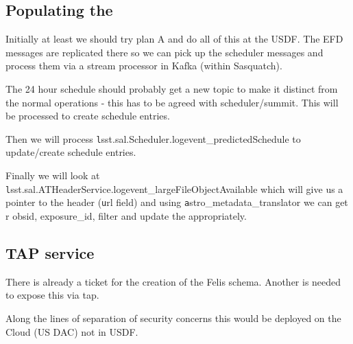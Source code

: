 \subsection{Populating the \DB}

Initially at least we should try plan A and do all of this at the USDF.
The EFD messages are replicated there so we can pick up the scheduler messages and process them via a stream processor in Kafka (within Sasquatch).

The 24 hour schedule should probably get a new topic to make it distinct from the normal operations - this has to be agreed with scheduler/summit. This will be processed to create schedule entries.

Then we will process {\texttt lsst.sal.Scheduler.logevent\_predictedSchedule } to update/create schedule entries.

Finally we will look at {\texttt lsst.sal.ATHeaderService.logevent\_largeFileObjectAvailable} which will give us a pointer to the header ({\texttt url} field) and using {\texttt astro\_metadata\_translator}  we can get r obsid, exposure\_id, filter and update the \DB appropriately.

\subsection{TAP service}

There is already a ticket  for the creation of the Felis schema.
Another is needed to expose this via tap.

Along the lines of separation of security concerns this would be deployed on the Cloud (US DAC) not in USDF.
